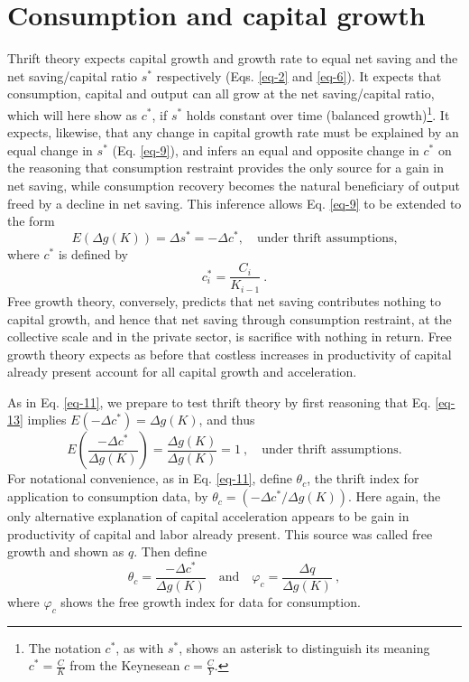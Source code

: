 \documentclass[a4paper,fleqn]{latex_styles/cas-sc}
\begin{document}
%

\FloatBarrier
%
\hypertarget{consumption-and-capital-growth}{%
\section{Consumption and capital growth}\label{consumption-and-capital-growth}}
Thrift theory expects capital growth and growth rate to equal net saving and the net saving/capital ratio \(s^*\) respectively (Eqs. \eqref{eq-2} and \eqref{eq-6}). It expects that consumption, capital and output can all grow at the net saving/capital ratio, which will here show as \(c^*\), if \(s^*\) holds constant over time (balanced growth)\footnote{The notation \(c^*\), as with \(s^*\), shows an asterisk to distinguish its meaning \(c^* = \frac{C}{K}\) from the Keynesean \(c = \frac{C}{Y}\).}. It expects, likewise, that any change in capital growth rate must be explained by an equal change in \(s^*\) (Eq. \eqref{eq-9}), and infers an equal and opposite change in \(c^*\) on the reasoning that consumption restraint provides the only source for a gain in net saving, while consumption recovery becomes the natural beneficiary of output freed by a decline in net saving. This inference allows Eq. \eqref{eq-9} to be extended to the form 
%
\begin{equation}
    E(\Delta g(K)) = \Delta s^* = -\Delta c^*, \quad \text{under thrift assumptions,} \label{eq-13}
\end{equation}
%
where \(c^*\) is defined by
%
\begin{equation*}
    c^*_i = \frac{C_i}{K_{i - 1}} \ .
\end{equation*}
%
Free growth theory, conversely, predicts that net saving contributes nothing to capital growth, and hence that net saving through consumption restraint, at the collective scale and in the private sector, is sacrifice with nothing in return. Free growth theory expects as before that costless increases in productivity of capital already present account for all capital growth and acceleration. 

As in Eq. \eqref{eq-11}, we prepare to test thrift theory by first reasoning that Eq. \eqref{eq-13} implies \(E(-\Delta c^*) = \Delta g (K)\), and thus
% 
\begin{equation}
    E(\frac{-\Delta c^*}{\Delta g (K)}) = \frac{\Delta g (K)}{\Delta g (K)} = 1\ , \quad \text{under thrift assumptions.} \label{eq-15}
\end{equation}
%
For notational convenience, as in Eq. \eqref{eq-11}, define \(\theta_c\), the thrift index for application to consumption data, by \(\theta_c = (-\Delta c^*/\Delta g (K))\). Here again, the only alternative explanation of capital acceleration appears to be gain in productivity of capital and labor already present. This source was called free growth and shown as \(q\). Then define
%
\begin{equation}
    \theta_c = \frac{-\Delta c^*}{\Delta g (K)}\quad \text{and} \quad \varphi_c = \frac{\Delta q}{\Delta g (K)}\ , \label{eq-16a}
\end{equation}
%
where \(\varphi_c\) shows the free growth index for data for consumption.
\end{document}
